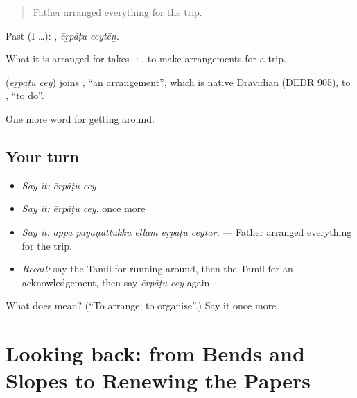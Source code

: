 \begin{quote}
Father arranged everything for the trip.
\end{quote}

Past (I …):  , \emph{ēṟpāṭu ceytēṉ}.

What it is arranged for takes -:   , to make arrangements for a trip.

\begin{cousinweb}
\textbf{ } (\emph{ēṟpāṭu cey}) joins , \textquotedblleft{}an arrangement\textquotedblright{}, which is native Dravidian (DEDR 905), to , \textquotedblleft{}to do\textquotedblright{}.
\end{cousinweb}

\begin{grammarlens}[title={What you've built}]
One more word for getting around.
\end{grammarlens}

\subsection*{Your turn}
\begin{itemize}
\raggedright
  \item \emph{Say it:} \emph{ēṟpāṭu cey}
  \item \emph{Say it:} \emph{ēṟpāṭu cey}, once more
  \item \emph{Say it:} \emph{appā payaṇattukku ellām ēṟpāṭu ceytār.} — Father arranged everything for the trip.
  \item \emph{Recall:} say the Tamil for running around, then the Tamil for an acknowledgement, then say \emph{ēṟpāṭu cey} again
\end{itemize}

\begin{tcolorbox}[breakable,colback=teal!4,colframe=teal!35!black,title={Before you move on}]
What does   mean? (\textquotedblleft{}To arrange; to organise\textquotedblright{}.) Say it once more.
\end{tcolorbox}
\section[(dialogue)]{Looking back: from Bends and Slopes to Renewing the Papers}

\label{lesson:TA-R415-review-408-415}



